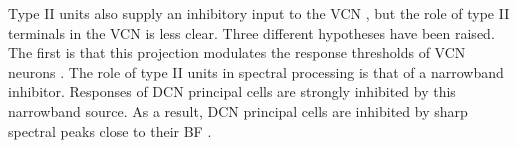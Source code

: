Type II units also supply an inhibitory input to the VCN \citep{WickesbergOertel:1990}, but the role of type II terminals in the VCN is
less clear. Three different hypotheses have been raised. The ﬁrst is
that this projection modulates the response thresholds of VCN
neurons \citep{PaoliniClark:1998}. 
The role of type II units in spectral processing is that of a
narrowband inhibitor. Responses of DCN principal cells are strongly
inhibited by this narrowband source. As a result, DCN principal cells
are inhibited by sharp spectral peaks close to their BF \citep{SpirouDavisEtAl:1999}.





